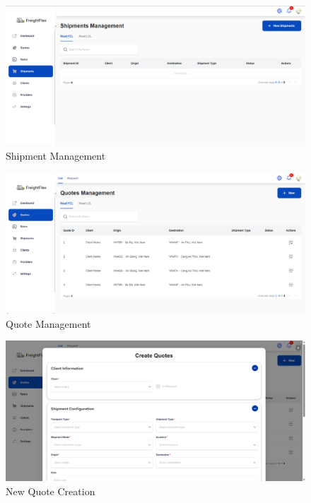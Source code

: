 \begin{figure}[H]
    \centering
    \includegraphics[width=15cm]{graphics/UI/shipment-management.png}
    \caption{Shipment Management}
    \label{fig:shipment-management}
\end{figure}

\begin{figure}[H]
    \centering
    \includegraphics[width=15cm]{graphics/UI/quote-managemet.png}
    \caption{Quote Management}
    \label{fig:quote-management}
\end{figure}

\begin{figure}[H]
    \centering
    \includegraphics[width=15cm]{graphics/UI/new-quotes.png}
    \caption{New Quote Creation}
    \label{fig:new-quotes}
\end{figure}

